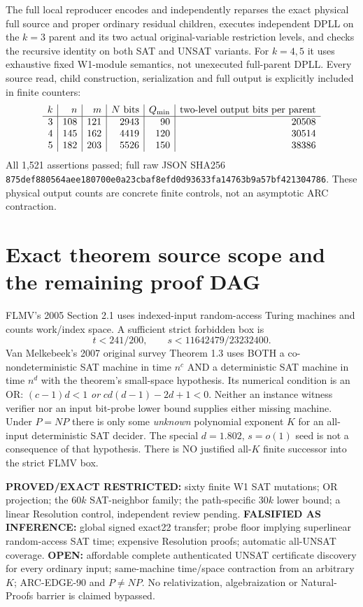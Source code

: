 \documentclass[11pt]{article}
\begin{document}
The full local reproducer encodes and independently
reparses the exact physical full source and proper
ordinary residual children, executes independent DPLL
on the $k=3$ parent and its two actual original-variable
restriction levels, and checks the recursive identity
on both SAT and UNSAT variants. For $k=4,5$ it
uses exhaustive fixed W1-module semantics, not
unexecuted full-parent DPLL. Every source read,
child construction, serialization and full output
is explicitly included in finite counters:
\[
\begin{array}{r|r|r|r|r|r}
k&n&m&N\ {\rm bits}&Q_{\min}&
{\rm two\text{-}level\ output\ bits\ per\ parent}\\\hline
3&108&121&2943&90&20508\\
4&145&162&4419&120&30514\\
5&182&203&5526&150&38386
\end{array}
\]
All 1,521 assertions passed; full raw JSON SHA256
\texttt{875def880564aee180700e0a23cbaf8efd0d93633fa14763b9a57bf421304786}.
These physical output counts are concrete finite
controls, not an asymptotic ARC contraction.

\section{Exact theorem source scope and the remaining proof DAG}
FLMV's 2005 Section 2.1 uses indexed-input
random-access Turing machines and counts work/index
space. A sufficient strict forbidden box is
\[
t<241/200,\qquad s<11642479/23232400.
\]
Van Melkebeek's 2007 original survey Theorem 1.3
uses BOTH a co-nondeterministic SAT machine in time
$n^c$ AND a deterministic SAT machine in time
$n^d$ with the theorem's small-space hypothesis.
Its numerical condition is an OR:
$(c-1)d<1$ \emph{or} $cd(d-1)-2d+1<0$.
Neither an instance witness verifier nor an input
bit-probe lower bound supplies either missing machine.
Under $P=NP$ there is only some \emph{unknown}
polynomial exponent $K$ for an all-input deterministic
SAT decider. The special $d=1.802$, $s=o(1)$ seed
is not a consequence of that hypothesis.
There is NO justified all-$K$ finite successor
into the strict FLMV box.

\noindent\textbf{PROVED/EXACT RESTRICTED:}
sixty finite W1 SAT mutations; OR projection;
the $60k$ SAT-neighbor family; the path-specific
$30k$ lower bound; a linear Resolution control,
independent review pending.
\textbf{FALSIFIED AS INFERENCE:}
global signed exact22 transfer; probe floor implying
superlinear random-access SAT time; expensive
Resolution proofs; automatic all-UNSAT coverage.
\textbf{OPEN:} affordable complete authenticated
UNSAT certificate discovery for every ordinary
input; same-machine time/space contraction from
an arbitrary $K$; ARC-EDGE-90 and $P\ne NP$.
No relativization, algebraization or
Natural-Proofs barrier is claimed bypassed.
\end{document}
